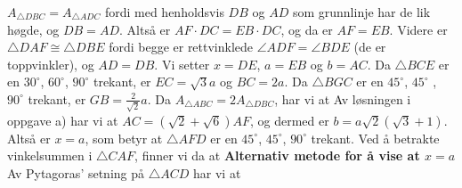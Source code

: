 {	
	$ A_{\triangle DBC}=A_{\triangle ADC} $ fordi med henholdsvis $ DB $ og $ AD $ som grunnlinje har de lik høgde, og $ DB=AD $. Altså er $ AF\cdot DC = EB\cdot DC $, og da er $ AF=EB $. Videre er $ \triangle DAF\cong \triangle DBE $ fordi begge er rettvinklede $ \angle ADF =\angle BDE$ (de er toppvinkler), og $ AD=DB $. Vi setter $ x=DE $, $ a=EB $ og $ b=AC $. Da $ \triangle BCE $ er en $ 30^\circ $, $ 60^\circ $, $ 90^\circ $ trekant, er $ EC=\sqrt{3}a $ og $ BC=2a $. Da $ \triangle BGC $ er en $ 45^\circ $, $ 45^\circ $ , $ 90^\circ $ trekant, er $ GB=\frac{2}{\sqrt{2}}a $. Da $ A_{\triangle ABC}=2A_{\triangle DBC} $, har vi at
	Av løsningen i oppgave a) har vi at $ {AC=(\sqrt{2}+\sqrt{6})AF}$, og dermed er $ b=a\sqrt{2}(\sqrt{3}+1)$. Altså er $ x=a $, som betyr at $ \triangle AFD $ er en $ 45^\circ $, $ 45^\circ $, $ 90^\circ $ trekant. Ved å betrakte vinkelsummen i $ \triangle CAF $, finner vi da at
	\textbf{Alternativ metode for å vise at \boldmath $ x=a $} \os
	Av Pytagoras' setning på $ \triangle ACD $ har vi at
}
\newpage
{}
